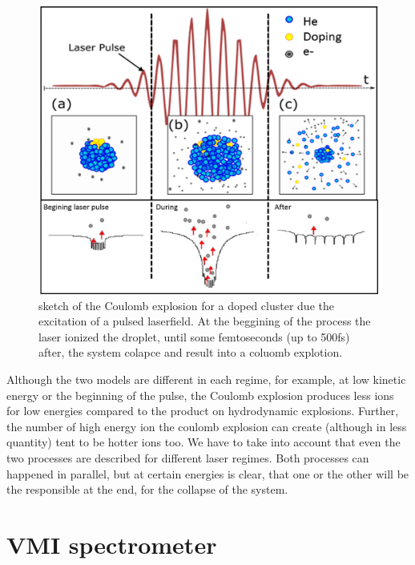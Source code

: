 \begin{figure}[hbtp]

\centering
\includegraphics[width=14cm]{../Images/cluster_regimes_2.png}
\caption{sketch of the Coulomb explosion for a doped cluster due the excitation of a pulsed laserfield. At the beggining of the process the laser ionized the droplet, until some femtoseconds (up to 500fs) after, the system colapce and result into a coluomb explotion.}
\label{fig:columbexplosion}
\end{figure}


Although the two models are different in each regime, for example, at low kinetic energy or the beginning of the pulse, the Coulomb explosion produces less ions for low energies compared to the product on hydrodynamic explosions. Further, the number of  high energy ion the coulomb explosion can create (although in less quantity) tent to be hotter ions too.
We have to take into account that even the two processes are described for different laser regimes. Both processes can happened in parallel, but at certain energies is clear, that one or the other will be the responsible at the end, for the collapse of the system.

\section{VMI spectrometer}

